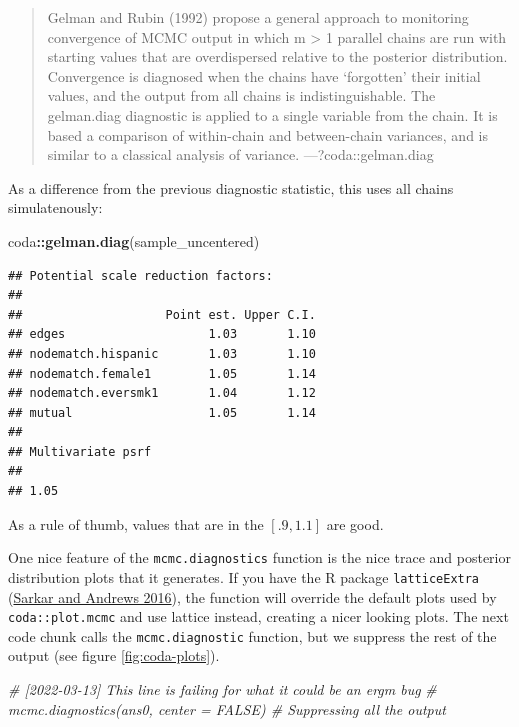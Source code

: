 \documentclass[
]{book}
\newenvironment{Shaded}{\begin{snugshade}}{\end{snugshade}}
\newcommand{\CommentTok}[1]{\textcolor[rgb]{0.56,0.35,0.01}{\textit{#1}}}
\newcommand{\FunctionTok}[1]{\textcolor[rgb]{0.13,0.29,0.53}{\textbf{#1}}}
\newcommand{\NormalTok}[1]{#1}
\newcommand{\SpecialCharTok}[1]{\textcolor[rgb]{0.81,0.36,0.00}{\textbf{#1}}}
\begin{document}
\begin{enumerate}
  \begin{quote}
  Gelman and Rubin (1992) propose a general approach to monitoring convergence of MCMC output in which m \textgreater{} 1 parallel chains are run with starting values that are overdispersed relative to the posterior distribution. Convergence is diagnosed when the chains have `forgotten' their initial values, and the output from all chains is indistinguishable. The gelman.diag diagnostic is applied to a single variable from the chain. It is based a comparison of within-chain and between-chain variances, and is similar to a classical analysis of variance.
  ---?coda::gelman.diag
  \end{quote}

  As a difference from the previous diagnostic statistic, this uses all chains simulatenously:

\begin{Shaded}
\begin{Highlighting}[]
\NormalTok{coda}\SpecialCharTok{::}\FunctionTok{gelman.diag}\NormalTok{(sample\_uncentered)}
\end{Highlighting}
\end{Shaded}

\begin{verbatim}
## Potential scale reduction factors:
## 
##                    Point est. Upper C.I.
## edges                    1.03       1.10
## nodematch.hispanic       1.03       1.10
## nodematch.female1        1.05       1.14
## nodematch.eversmk1       1.04       1.12
## mutual                   1.05       1.14
## 
## Multivariate psrf
## 
## 1.05
\end{verbatim}

  As a rule of thumb, values that are in the \([.9,1.1]\) are good.
\end{enumerate}

One nice feature of the \texttt{mcmc.diagnostics} function is the nice trace and posterior distribution plots that it generates. If you have the R package \texttt{latticeExtra} (\protect\hyperlink{ref-R-latticeExtra}{Sarkar and Andrews 2016}), the function will override the default plots used by \texttt{coda::plot.mcmc} and use lattice instead, creating a nicer looking plots. The next code chunk calls the \texttt{mcmc.diagnostic} function, but we suppress the rest of the output (see figure \ref{fig:coda-plots}).

\begin{Shaded}
\begin{Highlighting}[]
\CommentTok{\# [2022{-}03{-}13] This line is failing for what it could be an ergm bug}
\CommentTok{\# mcmc.diagnostics(ans0, center = FALSE) \# Suppressing all the output}
\end{Highlighting}
\end{Shaded}
\end{document}

